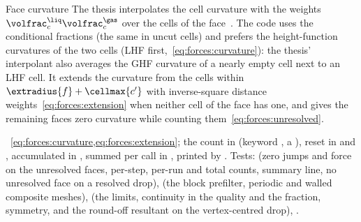 \begin{deviation}{Face curvature}\label{dev:forces:curvature}
The thesis interpolates the cell curvature with the weights
$\volfrac^{\liq}_c\volfrac^{\gas}_c$ over the cells of the
face~. The code uses the conditional fractions (the same in
uncut cells) and prefers the height-function curvatures of the two cells
(LHF first,~\cref{eq:forces:curvature}): the thesis' interpolant also
averages the GHF curvature of a nearly empty cell next to an LHF cell. It
extends the curvature from the cells within
$\extradius{f}+\cellmax{c'}$ with inverse-square distance
weights~\cref{eq:forces:extension} when neither cell of the face has one,
and gives the remaining faces zero curvature while counting
them~\cref{eq:forces:unresolved}.
\end{deviation}

\begin{implnote}
~\cref{eq:forces:curvature,eq:forces:extension};
the count in 
(keyword , a ), reset in
 and
, accumulated in
, summed per call in
, printed by
.
Tests: 
(zero jumps and force on the unresolved faces, per-step, per-run and total
counts, summary line, no unresolved face on a resolved drop),
(the block prefilter, periodic and walled composite meshes),
(the limits, continuity in the quality and the fraction, symmetry, and the
round-off resultant on the vertex-centred drop),
.
\end{implnote}

